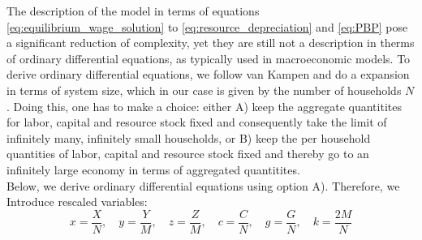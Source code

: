 The description of the model in terms of equations \eqref{eq:equilibrium_wage_solution} to \eqref{eq:resource_depreciation} and \eqref{eq:PBP} pose a significant reduction of complexity, yet they are still not a description in therms of ordinary differential equations, as typically used in macroeconomic models. To derive ordinary differential equations, we follow van Kampen and do a expansion in terms of system size, which in our case is given by the number of households $N$.
Doing this, one has to make a choice: either A) keep the aggregate quantitites for labor, capital and resource stock fixed and consequently take the limit of infinitely many, infinitely small households, or B) keep the per household quantities of labor, capital and resource stock fixed and thereby go to an infinitely large economy in terms of aggregated quantitites. \\
Below, we derive ordinary differential equations using option A). Therefore, we Introduce rescaled variables:
\begin{equation}
	x = \frac{X}{N}, \quad y = \frac{Y}{M}, \quad z = \frac{Z}{M}, \quad c = \frac{C}{N}, \quad g = \frac{G}{N}, \quad k = \frac{2M}{N}
\end{equation}



